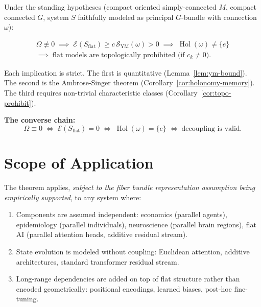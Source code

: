 \documentclass[12pt]{amsart}
\theoremstyle{plain}
\theoremstyle{definition}
\DeclareMathOperator{\Hol}{Hol}
\begin{document}
\begin{tcolorbox}[colback=goldbg, colframe=goldline, boxrule=1.5pt,
  title={\bfseries Master Statement}]
Under the standing hypotheses (compact oriented simply-connected $M$,
compact connected $G$, system $S$ faithfully modeled as principal
$G$-bundle with connection $\omega$):

\begin{multline*}
  \Omega \not\equiv 0
  \;\implies\;
  \mathcal{E}(S_{\mathrm{flat}}) \geq c\,\mathcal{S}_{\mathrm{YM}}(\omega) > 0
  \;\implies\;
  \Hol(\omega) \neq \{e\} \\
  \implies\;
  \text{flat models are topologically prohibited (if $c_k \neq 0$).}
\end{multline*}

\smallskip
Each implication is strict. The first is quantitative (Lemma~\ref{lem:ym-bound}).
The second is the Ambrose-Singer theorem (Corollary~\ref{cor:holonomy-memory}).
The third requires non-trivial characteristic classes
(Corollary~\ref{cor:topo-prohibit}).

\smallskip
\textbf{The converse chain:}
\[
  \Omega \equiv 0
  \;\iff\;
  \mathcal{E}(S_{\mathrm{flat}}) = 0
  \;\iff\;
  \Hol(\omega) = \{e\}
  \;\iff\;
  \text{decoupling is valid.}
\]
\end{tcolorbox}

\section{Scope of Application}
\label{sec:scope}

The theorem applies, \emph{subject to the fiber bundle representation
assumption being empirically supported}, to any system where:

\begin{enumerate}
  \item Components are assumed independent: economics (parallel agents),
    epidemiology (parallel individuals), neuroscience (parallel brain
    regions), flat AI (parallel attention heads, additive residual stream).

  \item State evolution is modeled without coupling: Euclidean attention,
    additive architectures, standard transformer residual stream.

  \item Long-range dependencies are added on top of flat structure rather
    than encoded geometrically: positional encodings, learned biases,
    post-hoc fine-tuning.
\end{enumerate}
\end{document}
